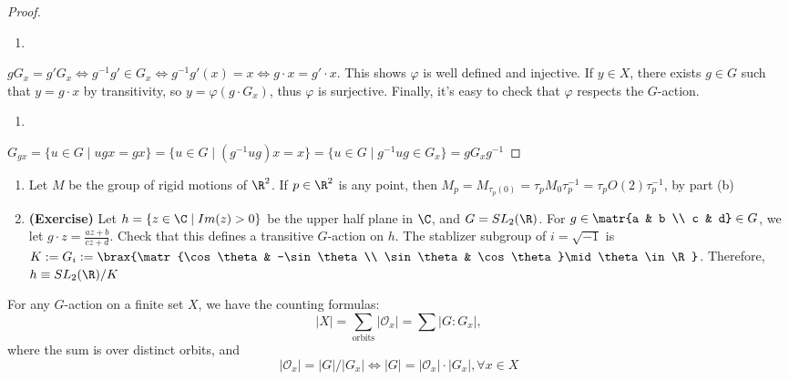 \begin{proof}
    \hfill
    \begin{enumerate}
        \item[(a)]
    \end{enumerate}
    $gG_x = g'G_x \iff g^{-1}g' \in G_x \iff g^{-1}g'(x)=x \iff g \cdot x = g'\cdot x$. This shows $\varphi$ is well defined and injective. If $y \in X$, there exists $g \in G$ such that $y=g\cdot x$ by transitivity, so $y = \varphi(g\cdot G_x)$, thus $\varphi$ is surjective. Finally, it's easy to check that $\varphi$ respects the $G$-action.
    \begin{enumerate}
        \item[(b)]
    \end{enumerate}
    $G_{gx}=\{u \in G \mid ugx = gx\} =\{ u \in G \mid (g^{-1}ug)x=x\}=\{ u \in G\mid g^{-1}ug \in G_x\} = gG_xg^{-1}$
\end{proof}

\begin{ex}
    \begin{enumerate}
        \item Let $M$ be the group of rigid motions of $\R^2$. If $p \in \R^2$ is any point, then $M_p =M_{\tau _p(0)}=\tau _pM_0\tau_p^{-1}=\tau _p O(2) \tau_p^{-1}$, by part (b)
        \item \textbf{(Exercise)} Let $h = \{ z \in \C \mid Im(z) >0\}$ be the upper half plane in $\C$, and $G = SL_2(\R)$. For $g \in \matr{a & b \\ c & d} \in G$, we let $g\cdot z =\frac{az+b}{cz+d}$. Check that this defines a transitive $G$-action on $h$. The stablizer subgroup of $i=\sqrt{-1}$ is $K:=G_i:=\brax{\matr{\cos \theta & -\sin \theta \\ \sin \theta & \cos \theta}\mid \theta \in \R}$. Therefore, $h \equiv SL_2(\R)/K$
    \end{enumerate}
\end{ex}

\begin{cor}
    For any $G$-action on a finite set $X$, we have the counting formulas:
    $$|X|=\sum_{\text{orbits}}|\mathcal O_x|= \sum|G:G_x|,$$
    where the sum is over distinct orbits, and
    $$|\mathcal O_x| = |G| / |G_x| \iff |G| = |\mathcal O_x| \cdot |G_x|,\forall x \in X$$
\end{cor}

